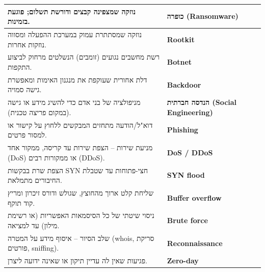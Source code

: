 \documentclass[11pt]{article}
\newcommand{\enLR}[1]{\textenglish{#1}}
\begin{document}
\begin{xltabular}{\linewidth}{|>{\setRTL\raggedleft\arraybackslash}X|>{\setRTL\raggedleft\arraybackslash}X|}
\hline
נוזקה שמצפינה קבצים ודורשת תשלום; פוגעת בזמינות. & \textbf{כופרה \enLR{(Ransomware)}} \\
\hline
נוזקה שמסתתרת עמוק במערכת ההפעלה ומסווה נוזקות אחרות. & \textbf{\enLR{Rootkit}} \\
\hline
רשת מחשבים נגועים (זומבים) הנשלטים מרחוק לביצוע התקפות. & \textbf{\enLR{Botnet}} \\
\hline
דלת אחורית שעוקפת את מנגנון האימות ומאפשרת גישה סמויה. & \textbf{\enLR{Backdoor}} \\
\hline
מניפולציה של בני אדם כדי להשיג מידע או גישה (במקום פריצה טכנית). & \textbf{הנדסה חברתית \enLR{(Social Engineering)}} \\
\hline
דוא"ל/הודעה מתחזים המבקשים ללחוץ על קישור או למסור פרטים. & \textbf{\enLR{Phishing}} \\
\hline
מניעת שירות – הצפת שירות עד קריסה, ממקור אחד \enLR{(DoS)} או ממקורות רבים \enLR{(DDoS).} & \textbf{\enLR{DoS / DDoS}} \\
\hline
הצפת שרת בבקשות \enLR{SYN} חצי-פתוחות עד שטבלת החיבורים מתמלאת. & \textbf{\enLR{SYN flood}} \\
\hline
שליחת קלט ארוך מהחוצץ, שגולש ודורס זיכרון ומריץ קוד תוקף. & \textbf{\enLR{Buffer overflow}} \\
\hline
ניסוי שיטתי של כל הסיסמאות האפשריות (או רשימת מילון) עד למציאה. & \textbf{\enLR{Brute force}} \\
\hline
שלב הסיור – איסוף מידע על המטרה \enLR{(whois}, סריקת פורטים, \enLR{sniffing).} & \textbf{\enLR{Reconnaissance}} \\
\hline
פגיעות שאין לה עדיין תיקון או שאינה ידועה ליצרן. & \textbf{\enLR{Zero-day}} \\
\hline
\end{xltabular}
\end{document}
